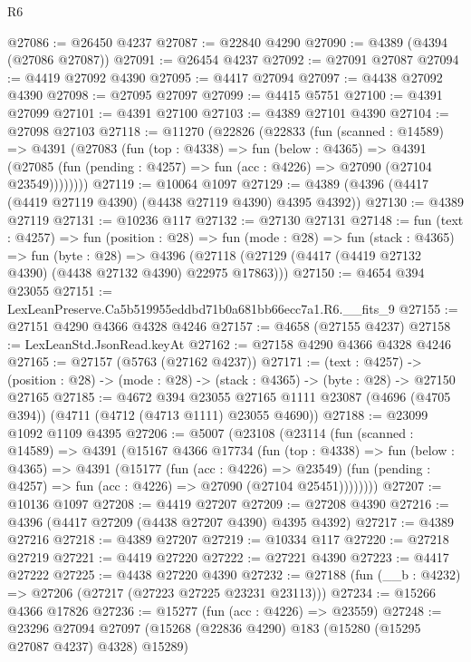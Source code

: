 \begin{lexlean}{R6}
\begin{coremodule}
@27086 := @26450 @4237
@27087 := @22840 @4290
@27090 := @4389 (@4394 (@27086 @27087))
@27091 := @26454 @4237
@27092 := @27091 @27087
@27094 := @4419 @27092 @4390
@27095 := @4417 @27094
@27097 := @4438 @27092 @4390
@27098 := @27095 @27097
@27099 := @4415 @5751
@27100 := @4391 @27099
@27101 := @4391 @27100
@27103 := @4389 @27101 @4390
@27104 := @27098 @27103
@27118 := @11270
    (@22826
      (@22833
        (fun (scanned : @14589) =>
        @4391
          (@27083
            (fun (top : @4338) =>
            fun (below : @4365) =>
            @4391
              (@27085 (fun (pending : @4257) => fun (acc : @4226) => @27090 (@27104 @23549))))))))
@27119 := @10064 @1097
@27129 := @4389 (@4396 (@4417 (@4419 @27119 @4390) (@4438 @27119 @4390) @4395 @4392))
@27130 := @4389 @27119
@27131 := @10236 @117
@27132 := @27130 @27131
@27148 := fun (text : @4257) =>
  fun (position : @28) =>
  fun (mode : @28) =>
  fun (stack : @4365) =>
  fun (byte : @28) =>
  @4396 (@27118 (@27129 (@4417 (@4419 @27132 @4390) (@4438 @27132 @4390) @22975 @17863)))
@27150 := @4654 @394 @23055
@27151 := LexLeanPreserve.Ca5b519955eddbd71b0a681bb66ecc7a1.R6.__fits_9
@27155 := @27151 @4290 @4366 @4328 @4246
@27157 := @4658 (@27155 @4237)
@27158 := LexLeanStd.JsonRead.keyAt
@27162 := @27158 @4290 @4366 @4328 @4246
@27165 := @27157 (@5763 (@27162 @4237))
@27171 := (text : @4257) ->
  (position : @28) -> (mode : @28) -> (stack : @4365) -> (byte : @28) -> @27150 @27165
@27185 := @4672
    @394
    @23055
    @27165
    @1111
    @23087
    (@4696 (@4705 @394))
    (@4711 (@4712 (@4713 @1111) @23055 @4690))
@27188 := @23099 @1092 @1109 @4395
@27206 := @5007
    (@23108
      (@23114
        (fun (scanned : @14589) =>
        @4391
          (@15167
            @4366
            @17734
            (fun (top : @4338) =>
            fun (below : @4365) =>
            @4391
              (@15177
                (fun (acc : @4226) => @23549)
                (fun (pending : @4257) => fun (acc : @4226) => @27090 (@27104 @25451))))))))
@27207 := @10136 @1097
@27208 := @4419 @27207
@27209 := @27208 @4390
@27216 := @4396 (@4417 @27209 (@4438 @27207 @4390) @4395 @4392)
@27217 := @4389 @27216
@27218 := @4389 @27207
@27219 := @10334 @117
@27220 := @27218 @27219
@27221 := @4419 @27220
@27222 := @27221 @4390
@27223 := @4417 @27222
@27225 := @4438 @27220 @4390
@27232 := @27188 (fun (__b : @4232) => @27206 (@27217 (@27223 @27225 @23231 @23113)))
@27234 := @15266 @4366 @17826
@27236 := @15277 (fun (acc : @4226) => @23559)
@27248 := @23296
    @27094
    @27097
    (@15268 (@22836 @4290) @183 (@15280 (@15295 @27087 @4237) @4328) @15289)

\end{coremodule}
\end{lexlean}
